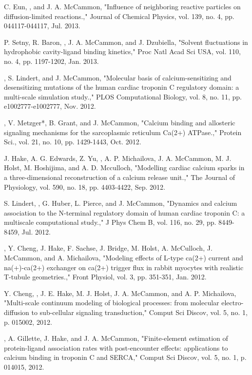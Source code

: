 \begin{etaremune}
\item C. Eun, \pmkh, and J. A. McCammon, "Influence of neighboring reactive particles on diffusion-limited reactions.," Journal of Chemical Physics, vol. 139, no. 4, pp. 044117-044117, Jul. 2013.
\item P. Setny, R. Baron, \pmkh, J. A. McCammon, and J. Dzubiella, "Solvent fluctuations in hydrophobic cavity-ligand binding kinetics," Proc Natl Acad Sci USA, vol. 110, no. 4, pp. 1197-1202, Jan. 2013.
\item \pmkh, S. Lindert, and J. McCammon, "Molecular basis of calcium-sensitizing and desensitizing mutations of the human cardiac troponin C regulatory domain: a multi-scale simulation study.," PLOS Computational Biology, vol. 8, no. 11, pp. e1002777-e1002777, Nov. 2012.
\item \pmkh*, V. Metzger*, B. Grant, and J. McCammon, "Calcium binding and allosteric signaling mechanisms for the sarcoplasmic reticulum Ca(2+)  ATPase.," Protein Sci., vol. 21, no. 10, pp. 1429-1443, Oct. 2012.
\item J. Hake, A. G. Edwards, Z. Yu, \pmkh, A. P. Michailova, J. A. McCammon, M. J. Holst, M. Hoshijima, and A. D. Mcculloch, "Modelling cardiac calcium sparks in a three-dimensional reconstruction of a calcium release unit.," The Journal of Physiology, vol. 590, no. 18, pp. 4403-4422, Sep. 2012.
\item S. Lindert, \pmkh, G. Huber, L. Pierce, and J. McCammon, "Dynamics and calcium association to the N-terminal regulatory domain of human cardiac troponin C: a multiscale computational study.," J Phys Chem B, vol. 116, no. 29, pp. 8449-8459, Jul. 2012.
\item \pmkh, Y. Cheng, J. Hake, F. Sachse, J. Bridge, M. Holst, A. McCulloch, J. McCammon, and A. Michailova, "Modeling effects of L-type ca(2+) current and na(+)-ca(2+) exchanger on ca(2+) trigger flux in rabbit myocytes with realistic T-tubule geometries.," Front Physiol, vol. 3, pp. 351-351, Jan. 2012.
\item Y. Cheng, \pmkh, J. E. Hake, M. J. Holst, J. A. McCammon, and A. P. Michailova, "Multi-scale continuum modeling of biological processes: from molecular electro-diffusion to sub-cellular signaling transduction," Comput Sci Discov, vol. 5, no. 1, p. 015002, 2012.
\item \pmkh, A. Gillette, J. Hake, and J. A. McCammon, "Finite-element estimation of protein-ligand association rates with post-encounter effects: applications to calcium binding in troponin C and SERCA," Comput Sci Discov, vol. 5, no. 1, p. 014015, 2012.

\end{etaremune}
